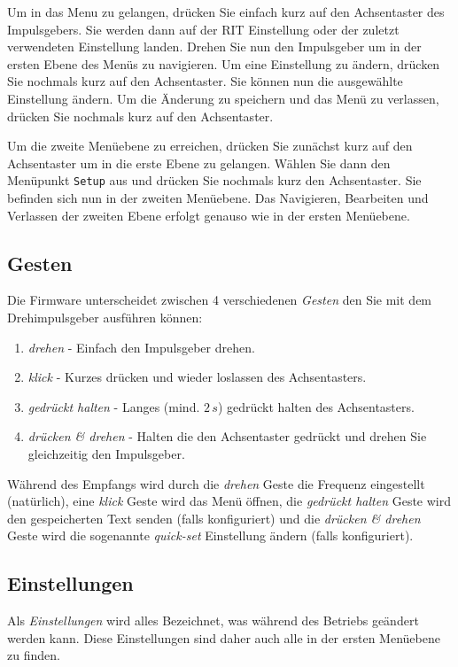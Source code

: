 \documentclass[10pt, a4paper,twoside]{scrartcl}
\begin{document}
Um in das Menu zu gelangen, drücken Sie einfach kurz auf den Achsentaster des Impulsgebers. Sie werden dann auf der RIT Einstellung oder der zuletzt verwendeten Einstellung landen. Drehen Sie nun den Impulsgeber um in der ersten Ebene des Menüs zu navigieren. Um eine Einstellung zu ändern, drücken Sie nochmals kurz auf den Achsentaster. Sie können nun die ausgewählte Einstellung ändern. Um die Änderung zu speichern und das Menü zu verlassen, drücken Sie nochmals kurz auf den Achsentaster.

Um die zweite Menüebene zu erreichen, drücken Sie zunächst kurz auf den Achsentaster um in die erste Ebene zu gelangen. Wählen Sie dann den Menüpunkt \texttt{Setup} aus und drücken Sie nochmals kurz den Achsentaster. Sie befinden sich nun in der zweiten Menüebene. Das Navigieren, Bearbeiten und Verlassen der zweiten Ebene erfolgt genauso wie in der ersten Menüebene.

\subsection{Gesten}
Die Firmware unterscheidet zwischen 4 verschiedenen \emph{Gesten} den Sie mit dem Drehimpulsgeber ausführen können:
\begin{enumerate}
 \item \emph{drehen} - Einfach den Impulsgeber drehen.
 \item \emph{klick} - Kurzes drücken und wieder loslassen des Achsentasters.
 \item \emph{gedrückt halten} - Langes (mind. $2\,s$) gedrückt halten des Achsentasters.
 \item \emph{drücken \& drehen} - Halten die den Achsentaster gedrückt und drehen Sie gleichzeitig den Impulsgeber.
\end{enumerate}

Während des Empfangs wird durch die \emph{drehen} Geste die Frequenz eingestellt (natürlich), eine \emph{klick} Geste wird das Menü öffnen, die \emph{gedrückt halten} Geste wird den gespeicherten Text senden (falls konfiguriert) und die \emph{drücken \& drehen} Geste wird die sogenannte \emph{quick-set} Einstellung ändern (falls konfiguriert).


\subsection{Einstellungen}
Als \emph{Einstellungen} wird alles Bezeichnet, was während des Betriebs geändert werden kann. Diese Einstellungen sind daher auch alle in der ersten Menüebene zu finden. 
 
\end{document}
